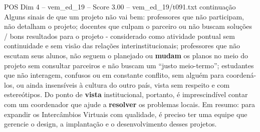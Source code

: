 \begin{textsample}{POS Dim 4 – vem\_ed\_19 – Score 3.00 – vem\_ed\_19/t091.txt}  \label{ex:f4_pos_109}
continuação Alguns sinais de que um projeto não vai bem: professores que não participam, não detalham o projeto; docentes que culpam o parceiro ou não buscam soluções / bons resultados para o projeto - considerado como atividade pontual sem continuidade e sem visão das relações interinstitucionais; professores que não escutam seus alunos, não seguem o planejado ou \textbf{mudam} os planos no meio do projeto sem consultar parceiros e não buscam um “justo meio-termo”; estudantes que não interagem, confusos ou em constante conflito, sem alguém para coordená-los, ou ainda insensíveis à cultura do outro país, vista sem respeito e com estereótipos.
Do ponto de \textbf{vista} institucional, portanto, é imprescindível contar com um coordenador que ajude a \textbf{resolver} os problemas locais.
Em resumo: para expandir os Intercâmbios Virtuais com qualidade, é preciso ter uma equipe que gerencie o design, a implantação e o desenvolvimento desses projetos.

\end{textsample}
